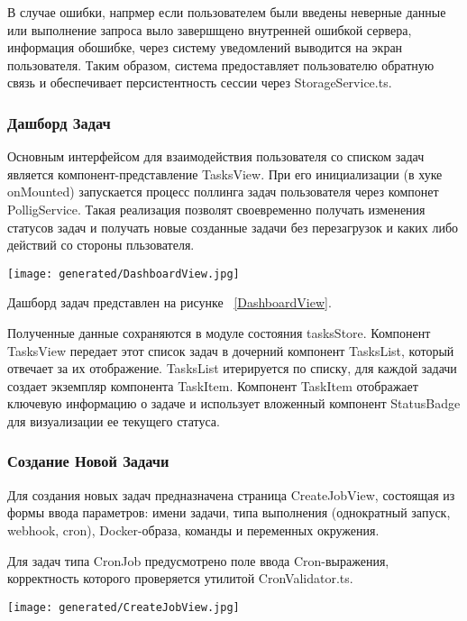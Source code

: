 В случае ошибки, напрмер если пользователем были введены неверные данные или выполнение запроса выло завершщено внутренней ошибкой сервера, информация обошибке, через систему уведомлений выводится на экран пользователя.  Таким образом, система предоставляет пользователю обратную связь и обеспечивает персистентность сессии через StorageService.ts.

\subsubsection{Дашборд Задач}

Основным интерфейсом для взаимодействия пользователя со списком задач является компонент-представление TasksView. При его инициализации (в хуке onMounted)\cite{tikhonova2021design} запускается процесс поллинга задач пользователя через компонет PolligService. Такая реализация позволят своевременно получать изменения статусов задач и получать новые созданные задачи без перезагрузок и каких либо действий со стороны пльзователя.

\begin{figure*}[!t]
  \centering
  \texttt{[image: generated/DashboardView.jpg]}
  \caption{Дашборд задач пользователя}
  \label{DashboardView}
\end{figure*}

Дашборд задач представлен на рисунке ~\ref{DashboardView}.

Полученные данные сохраняются в модуле состояния tasksStore.
Компонент TasksView передает этот список задач в дочерний компонент TasksList, который отвечает за их отображение.
TasksList итерируется по списку, для каждой задачи создает экземпляр компонента TaskItem.
Компонент TaskItem отображает ключевую информацию о задаче и использует вложенный компонент StatusBadge для визуализации ее текущего статуса.

\subsubsection{Создание Новой Задачи}

Для создания новых задач предназначена страница CreateJobView, состоящая из формы ввода параметров: имени задачи, типа выполнения (однократный запуск, webhook, cron), Docker-образа, команды и переменных окружения.

Для задач типа CronJob предусмотрено поле ввода Cron-выражения, корректность которого проверяется утилитой CronValidator.ts.

\begin{figure*}[!t]
  \centering
  \texttt{[image: generated/CreateJobView.jpg]}
  \caption{Форма создания новой задачи}
  \label{CreateJobView}
\end{figure*}

